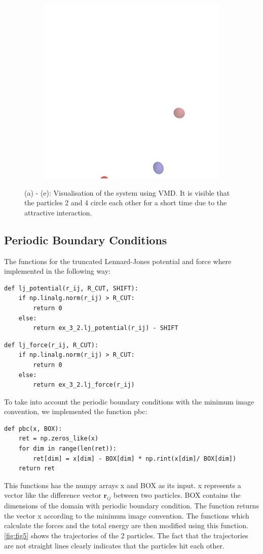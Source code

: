 \documentclass[a4paper,10pt,bibtotoc]{scrartcl}
\begin{document}
\begin{figure}
\begin{subfigure}[t]{.5\textwidth}
        \includegraphics[width=.8\linewidth]{scene5.png}
        \label{fig:sfig1}
    \end{subfigure}\hfill %
    \caption{(a) - (e): Visualisation of the system using VMD. It is visible that the particles 2 and 4 circle each other for a short time due to the attractive interaction.}
    \label{fig:fig4}
\end{figure}

\subsection{Periodic Boundary Conditions}
The functions for the truncated Lennard-Jones potential and force where implemented in the following way:
\begin{lstlisting}
def lj_potential(r_ij, R_CUT, SHIFT):
    if np.linalg.norm(r_ij) > R_CUT:
        return 0
    else:
        return ex_3_2.lj_potential(r_ij) - SHIFT
\end{lstlisting}

\begin{lstlisting}
def lj_force(r_ij, R_CUT):
    if np.linalg.norm(r_ij) > R_CUT:
        return 0
    else:
        return ex_3_2.lj_force(r_ij)
\end{lstlisting}
To take into account the periodic boundary conditions with the minimum image convention, we implemented the function pbc:
\begin{lstlisting}
def pbc(x, BOX):
    ret = np.zeros_like(x)
    for dim in range(len(ret)):
        ret[dim] = x[dim] - BOX[dim] * np.rint(x[dim]/ BOX[dim])
    return ret
\end{lstlisting}
This functions has the numpy arrays x and BOX as its input.
x represents a vector like the difference vector $\mathbf{r}_{ij}$ between two particles. 
BOX contains the dimensions of the domain with periodic boundary condition.
The function returns the vector x according to the minimum image convention.
The functions which calculate the forces and the total energy are then modified using this function.
\autoref{fig:fig5} shows the trajectories of the 2 particles. 
The fact that the trajectories are not straight lines clearly indicates that the particles hit each other.
\end{document}
